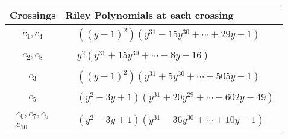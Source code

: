 \documentclass[1p]{elsarticle_modified}
\theoremstyle{definition}
\begin{document}
\begin{tabular}{m{50pt}|m{274pt}}
Crossings & \hspace{64pt}Riley Polynomials at each crossing \\
\hline $$\begin{aligned}c_{1},c_{4}\end{aligned}$$&$\begin{aligned}
&((y-1)^2)(y^{31}-15 y^{30}+\cdots+29 y-1)
\end{aligned}$\\
\hline $$\begin{aligned}c_{2},c_{8}\end{aligned}$$&$\begin{aligned}
&y^2(y^{31}+15 y^{30}+\cdots-8 y-16)
\end{aligned}$\\
\hline $$\begin{aligned}c_{3}\end{aligned}$$&$\begin{aligned}
&((y-1)^2)(y^{31}+5 y^{30}+\cdots+505 y-1)
\end{aligned}$\\
\hline $$\begin{aligned}c_{5}\end{aligned}$$&$\begin{aligned}
&(y^2-3 y+1)(y^{31}+20 y^{29}+\cdots-602 y-49)
\end{aligned}$\\
\hline $$\begin{aligned}c_{6},c_{7},c_{9}\\c_{10}\end{aligned}$$&$\begin{aligned}
&(y^2-3 y+1)(y^{31}-36 y^{30}+\cdots+10 y-1)
\end{aligned}$\\
\hline
\end{tabular}
\vskip 2pc
\end{document}
